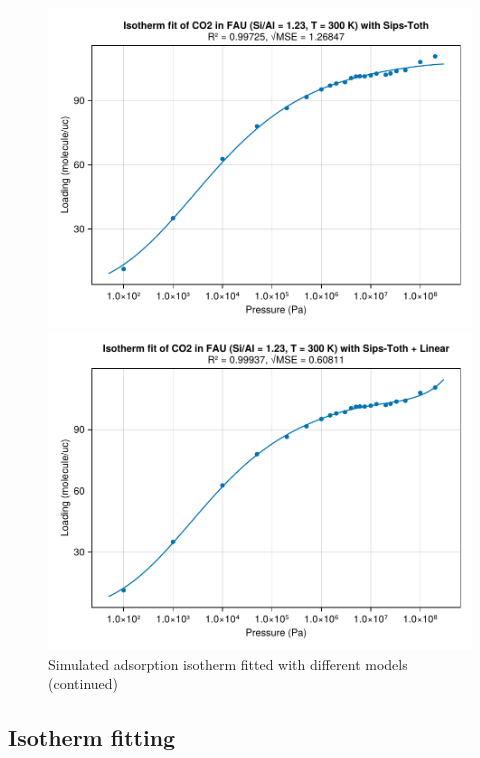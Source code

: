 \documentclass[main.tex]{subfiles}
\begin{document}
\begin{figure}
	\begin{minipage}{0.49\columnwidth}
		\includegraphics[width=\columnwidth]{figures/isotherms/Sips-Toth.pdf}
	\end{minipage}\hfill%
	\begin{minipage}{0.49\columnwidth}
		\includegraphics[width=\columnwidth]{figures/isotherms/Sips-Toth + Linear.pdf}
	\end{minipage}
	\caption{Simulated adsorption isotherm fitted with different models (continued)}
\end{figure}

\subsection{Isotherm fitting}
\end{document}

